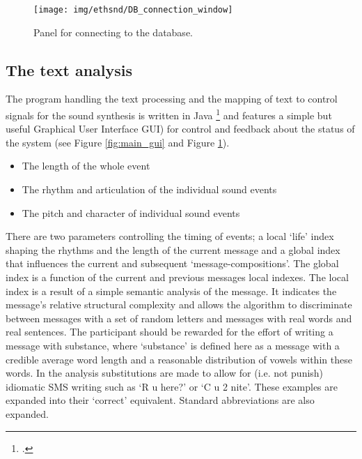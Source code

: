 \begin{figure}[hbp]
  \centering
  \texttt{[image: img/ethsnd/DB\_connection\_window]}
  \caption{Panel for connecting to the database.}
  \label{fig:DBpane}
\end{figure}

\subsection{The text analysis}
The program handling the text processing and the mapping of text to control signals for the sound synthesis is written in Java \footcite{j2se} and features a simple but useful Graphical User Interface  GUI) for control and feedback about the status of the system (see Figure \ref{fig:main_gui} and Figure \ref{fig:DBpane}).  

\begin{itemize}
\item{The length of the whole event}
\item{The rhythm and articulation of the individual sound events}
\item{The pitch and character of individual sound events}
\end{itemize}
There are two parameters controlling the timing of events; a local `life' index shaping the rhythms and the length of the current message and a global index that influences the current and subsequent `message-compositions'. The global index is a function of the current and previous messages local indexes. The local index is a result of a simple semantic analysis of the message. It indicates the message's relative structural complexity and allows the algorithm to discriminate between messages with a set of random letters and messages with real words and real sentences. The participant should be rewarded for the effort of writing a message with substance, where `substance' is defined here as a message with a credible average word length and a reasonable distribution of vowels within these words. In the analysis substitutions are made to allow for (i.e. not punish) idiomatic SMS writing such as `R u here?' or `C u 2 nite'. These examples are expanded into their `correct' equivalent. Standard abbreviations are also expanded. 

